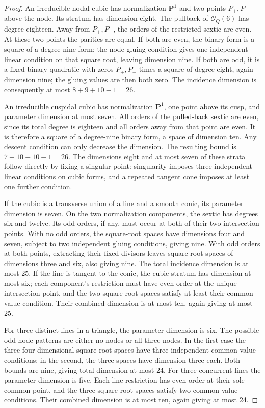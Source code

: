 \begin{proof}
An irreducible nodal cubic has normalization $\mathbf P^1$ and two
points $P_+,P_-$ above the node.  Its stratum has dimension eight.
The pullback of $\mathcal O_Q(6)$ has degree eighteen.
Away from $P_+,P_-$, the orders of the restricted sextic are even.
At these two points the parities are equal.  If both are even, the
binary form is a square of a degree-nine form; the node gluing
condition gives one independent linear condition on that square root,
leaving dimension nine.  If both are odd, it is a fixed binary
quadratic with zeros $P_+,P_-$ times a square of degree eight, again
dimension nine; the gluing values are then both zero.  The incidence
dimension is consequently at most $8+9+10-1=26$.

An irreducible cuspidal cubic has normalization $\mathbf P^1$, one
point above its cusp, and parameter dimension at most seven.  All
orders of the pulled-back sextic are even, since its total degree is
eighteen and all orders away from that point are even.  It is therefore
a square of a degree-nine binary form, a space of dimension ten.
Any descent condition can only decrease the dimension.  The resulting
bound is $7+10+10-1=26$.  The dimensions eight and at most seven of
these strata follow directly by fixing a singular point: singularity
imposes three independent linear conditions on cubic forms, and a
repeated tangent cone imposes at least one further condition.

If the cubic is a transverse union of a line and a smooth conic, its
parameter dimension is seven.  On the two normalization components,
the sextic has degrees six and twelve.  Its odd orders, if any, must
occur at both of their two intersection points.  With no odd orders,
the square-root spaces have dimensions four and seven, subject to
two independent gluing conditions, giving nine.  With odd orders at
both points, extracting their fixed divisors leaves square-root
spaces of dimensions three and six, also giving nine.  The total
incidence dimension is at most 25.  If the line is tangent to the
conic, the cubic stratum has dimension at most six; each component's
restriction must have even order at the unique intersection point,
and the two square-root spaces satisfy at least their common-value
condition.  Their combined dimension is at most ten, again giving
at most 25.

For three distinct lines in a triangle, the parameter dimension is
six.  The possible odd-node patterns are either no nodes or all three
nodes.  In the first case the three four-dimensional square-root
spaces have three independent common-value conditions; in the second,
the three spaces have dimension three each.  Both bounds are nine,
giving total dimension at most 24.  For three concurrent lines the
parameter dimension is five.  Each line restriction has even order
at their sole common point, and the three square-root spaces satisfy
two common-value conditions.  Their combined dimension is at most
ten, again giving at most 24.


\end{proof}
